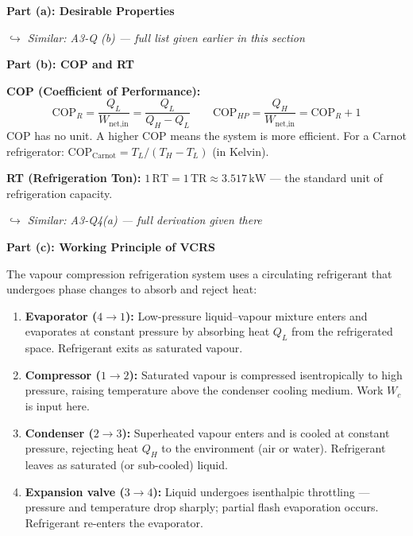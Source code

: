 \documentclass[12pt,a3paper]{article}
\newcommand{\variant}[1]{\par\vspace{1pt}\textcolor{blue!50!black}%
  {\footnotesize\textit{$\hookrightarrow$ Similar: #1}}}
\begin{document}
\begin{enumerate}
\begin{tcolorbox}[enhanced,breakable,ansbox,colback=cC!4,colframe=cC,
  boxrule=0.8pt,arc=5pt,
  title={\textbf{Answer}},fonttitle=\bfseries\color{white},colbacktitle=cC]

\textbf{Part (a): Desirable Properties}
\variant{A3-Q (b) — full list given earlier in this section}

\hrulefill

\textbf{Part (b): COP and RT}

\textbf{COP (Coefficient of Performance):}
\[
  \text{COP}_R = \frac{Q_L}{W_{\text{net,in}}} = \frac{Q_L}{Q_H - Q_L}
  \qquad
  \text{COP}_{HP} = \frac{Q_H}{W_{\text{net,in}}} = \text{COP}_R + 1
\]
COP has no unit. A higher COP means the system is more efficient. For a
Carnot refrigerator: $\text{COP}_\text{Carnot} = T_L / (T_H - T_L)$ (in
Kelvin).

\textbf{RT (Refrigeration Ton):}
$1\,\text{RT} = 1\,\text{TR} \approx 3.517\,\text{kW}$ — the standard unit
of refrigeration capacity. \variant{A3-Q4(a) — full derivation given there}

\hrulefill

\textbf{Part (c): Working Principle of VCRS}

The vapour compression refrigeration system uses a circulating refrigerant
that undergoes phase changes to absorb and reject heat:

\begin{enumerate}[leftmargin=1.8em,itemsep=2pt,label=\arabic*.]
  \item \textbf{Evaporator ($4\to1$):} Low-pressure liquid--vapour mixture
        enters and evaporates at constant pressure by absorbing heat $Q_L$
        from the refrigerated space. Refrigerant exits as saturated vapour.
  \item \textbf{Compressor ($1\to2$):} Saturated vapour is compressed
        isentropically to high pressure, raising temperature above the
        condenser cooling medium. Work $W_c$ is input here.
  \item \textbf{Condenser ($2\to3$):} Superheated vapour enters and is
        cooled at constant pressure, rejecting heat $Q_H$ to the environment
        (air or water). Refrigerant leaves as saturated (or sub-cooled) liquid.
  \item \textbf{Expansion valve ($3\to4$):} Liquid undergoes isenthalpic
        throttling — pressure and temperature drop sharply; partial flash
        evaporation occurs. Refrigerant re-enters the evaporator.
\end{enumerate}


\end{tcolorbox}
\end{enumerate}
\end{document}
